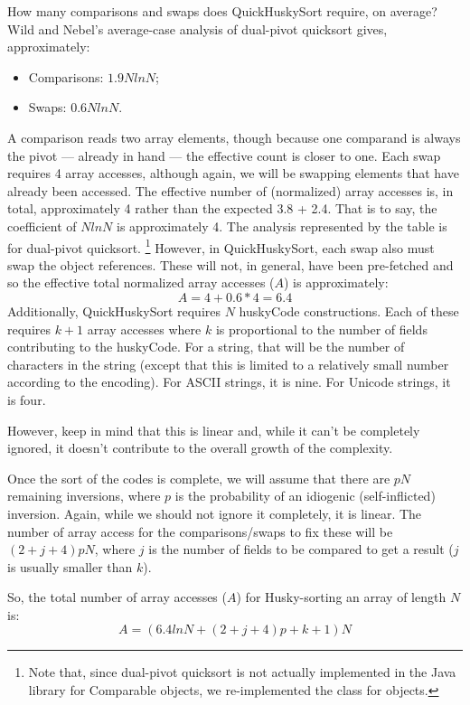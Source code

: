\documentclass[twoside,leqno,twocolumn]{article}
\begin{document}
How many comparisons and swaps does QuickHuskySort require, on average?
Wild and Nebel's average-case analysis of dual-pivot quicksort\cite{WildNebel12} gives, approximately:
\begin{itemize}
    \item Comparisons: $1.9 N ln N$;
    \item Swaps: $0.6 N ln N$.
\end{itemize}

A comparison reads two array elements, though because one comparand is always the pivot --- already
in hand --- the effective count is closer to one.
Each swap requires 4 array accesses, although again, we will be swapping elements that have already been accessed.
The effective number of (normalized) array accesses is, in total, approximately 4 rather than the expected 3.8 + 2.4.
That is to say, the coefficient of $N ln N$ is approximately 4.
The analysis represented by the table is for dual-pivot quicksort.
\footnote{Note that, since dual-pivot quicksort is not actually implemented in the Java library for Comparable objects,
    we re-implemented the class for objects.}
However, in QuickHuskySort, each swap also must swap the object references.
These will not, in general, have been pre-fetched and so the effective total normalized array accesses ($A$) is approximately:
\[A = 4 + 0.6 * 4 = 6.4\]
Additionally, QuickHuskySort requires $N$ huskyCode constructions.
Each of these requires $k+1$ array accesses where $k$ is proportional to the number of fields contributing to the huskyCode.
For a string,
that will be the number of characters in the string (except that this is limited to a relatively small number according to the encoding).
For ASCII strings, it is nine.
For Unicode strings, it is four.

However, keep in mind that this is linear and, while it can’t be completely ignored,
it doesn't contribute to the overall growth of the complexity.

Once the sort of the codes is complete, we will assume that there are $p N$ remaining inversions,
where $p$ is the probability of an idiogenic (self-inflicted) inversion.
Again, while we should not ignore it completely, it is linear.
The number of array access for the comparisons/swaps to fix these will be $(2 + j + 4) p N$,
where $j$ is the number of fields to be compared to get a result ($j$ is usually smaller than $k$).

So, the total number of array accesses ($A$) for Husky-sorting an array of length $N$ is:
\[A = (6.4 ln N + (2 + j + 4) p + k + 1) N\]
   
\end{document}
